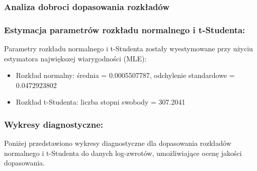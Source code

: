 \documentclass[a4paper,11pt]{article}
\begin{document}
\subsubsection{Analiza dobroci dopasowania rozkładów}

\subsubsection{Estymacja parametrów rozkładu normalnego i t-Studenta:}

Parametry rozkładu normalnego i t-Studenta zostały wyestymowane przy użyciu estymatora największej wiarygodności (MLE):
\begin{itemize}
    \item Rozkład normalny: średnia = 0.0005507787, odchylenie standardowe = 0.0472923802
    \item Rozkład t-Studenta: liczba stopni swobody = 307.2041
\end{itemize}

\subsubsection{Wykresy diagnostyczne:}

Poniżej przedstawiono wykresy diagnostyczne dla dopasowania rozkładów normalnego i t-Studenta do danych log-zwrotów, umożliwiające ocenę jakości dopasowania.
\end{document}
